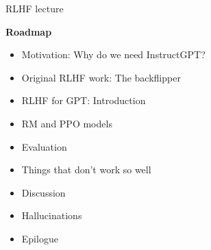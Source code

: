 \begin{vbframe}{RLHF lecture}

\vfill

\textbf{Roadmap}

	\begin{itemize}
		\item Motivation: Why do we need InstructGPT?
		\item Original RLHF work: The backflipper
                \item RLHF for GPT: Introduction 
                  \item RM and PPO models
                  \item Evaluation
                    \item Things that don't work so well
\item Discussion
\item Hallucinations
\item Epilogue
	\end{itemize}

\vfill

\end{vbframe}
